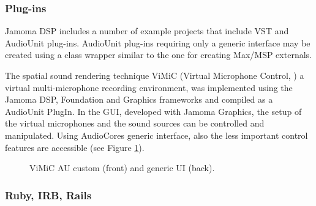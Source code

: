 \documentclass[twoside,10pt]{article}
\begin{document}
\subsubsection{Plug-ins}

Jamoma DSP includes a number of example projects that include VST and AudioUnit plug-ins.  AudioUnit plug-ins requiring only a generic interface may be created using a class wrapper similar to the one for creating Max/MSP externals.  

The spatial sound rendering technique ViMiC (Virtual Microphone Control, \cite{CMJ08-VIMIC}) a virtual multi-microphone recording environment, was implemented using the Jamoma DSP, Foundation and Graphics frameworks and compiled as a AudioUnit PlugIn. In the GUI, developed with Jamoma Graphics, the setup of the virtual microphones and the sound sources can be controlled and manipulated. Using AudioCores generic interface, also the less important control features are accessible (see Figure \ref{fig:vimic}).           


\begin{figure}[htbp]
\centerline{}
\caption{ViMiC AU custom (front) and generic UI (back).}
\label{fig:vimic}
\end{figure}



\subsubsection{Ruby, IRB, Rails}
\end{document}
